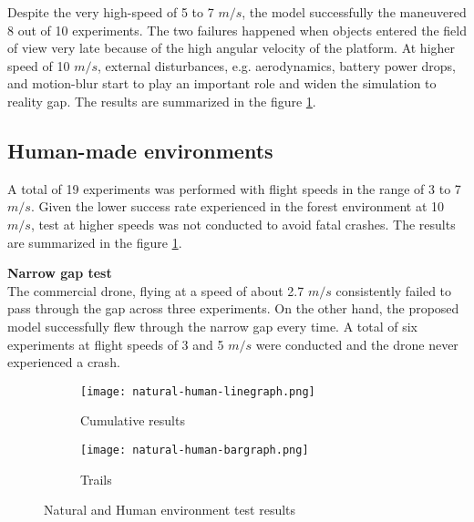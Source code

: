 Despite the very high-speed of 5 to 7 $m/s$, the model successfully the
maneuvered 8 out of 10 experiments. The
two failures happened when objects entered the field of view very late
because of the high angular velocity of the platform. At higher speed of 10 $m/s$, external disturbances, e.g. aerodynamics, battery power drops, and motion-blur start to play an important role
and widen the simulation to reality gap. 
The results are summarized in the figure \ref{fig:natual-human-result}.

\subsection{Human-made environments}
A total of 19 experiments was performed with flight speeds in
the range of 3 to 7 $m/s$. Given the lower success rate experienced
in the forest environment at 10 $m/s$, test at higher speeds was not conducted to avoid fatal crashes. The results are summarized in the figure \ref{fig:natual-human-result}.

\textbf{Narrow gap test}\\
The commercial
drone, flying at a speed of about 2.7 $m/s$ consistently failed to pass
through the gap across three experiments. On the other hand, the proposed model successfully
flew through the narrow gap every time. A total of six
 experiments at flight speeds of 3 and 5 $m/s$ were conducted and the drone never experienced a
crash.


\begin{figure}[!h]
	\begin{subfigure}[b]{0.38\textwidth}
		\centering
		\texttt{[image: natural-human-linegraph.png]}
		\caption{Cumulative results}
	\end{subfigure}
	\hfill
	\begin{subfigure}[b]{0.58\textwidth}
		\centering
		\texttt{[image: natural-human-bargraph.png]}
		\caption{Trails}
	\end{subfigure}
	\caption{Natural and Human environment test results}
	\label{fig:natual-human-result}
\end{figure}

